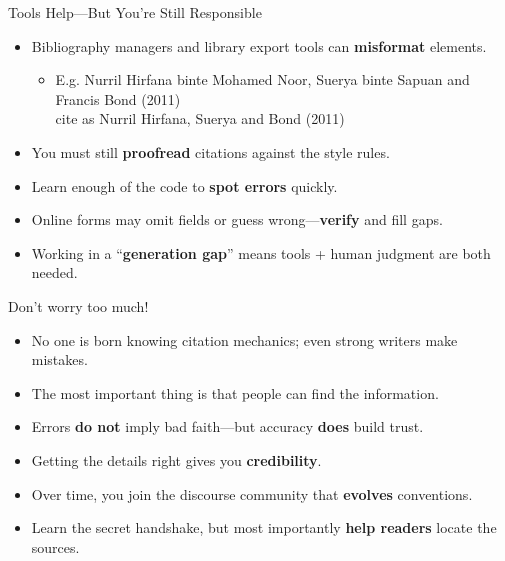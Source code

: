 \documentclass[aspectratio=169]{beamer}
\begin{document}
\begin{frame}{Tools Help—But You’re Still Responsible}
\begin{itemize}
\item Bibliography managers and library export tools can \textbf{misformat} elements.
  \begin{itemize}
  \item E.g. Nurril Hirfana binte Mohamed Noor, Suerya binte Sapuan and Francis Bond (2011)
    \\ cite as Nurril Hirfana, Suerya and Bond (2011) 
  \end{itemize}
  \item You must still \textbf{proofread} citations against the style rules.
  \item Learn enough of the code to \textbf{spot errors} quickly.
  \item Online forms may omit fields or guess wrong—\textbf{verify} and fill gaps.
  \item Working in a “\textbf{generation gap}” means tools + human judgment are both needed.
\end{itemize}
\end{frame}

\begin{frame}{Don't worry too much!}
\begin{itemize}
  \item No one is born knowing citation mechanics; even strong writers make mistakes.
  \item The most important thing is that people can find the information.
  \item Errors \textbf{do not} imply bad faith—but accuracy \textbf{does} build trust.
  \item Getting the details right gives you \textbf{credibility}.
  \item Over time, you join the discourse community that \textbf{evolves} conventions.
  \item Learn the secret handshake, but most importantly \textbf{help readers} locate the sources.
\end{itemize}
\end{frame}

\end{document}
